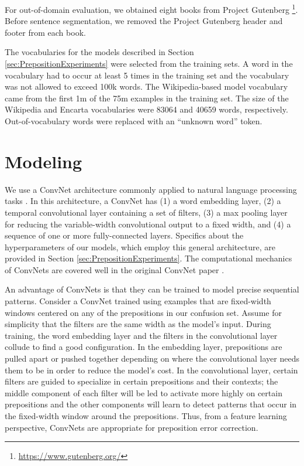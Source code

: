 For out-of-domain evaluation, we obtained eight books from Project Gutenberg \footnote{\url{https://www.gutenberg.org/}}.  Before sentence segmentation, we removed the Project Gutenberg header and footer from each book.

The vocabularies for the models described in Section \ref{sec:PrepositionExperiments} were selected from the training sets.  A word in the vocabulary had to occur at least 5 times in the training set and the vocabulary was not allowed to exceed 100k words.  The Wikipedia-based model vocabulary came from the first 1m of the 75m examples in the training set.  The size of the Wikipedia and Encarta vocabularies were 83064 and 40659 words, respectively.  Out-of-vocabulary words were replaced with an ``unknown word'' token. 

\section{Modeling} 
\label{sec:PrepositionModel}


We use a ConvNet architecture commonly applied to natural language processing tasks \cite{collobert2008unified,kim2014}.  In this architecture, a ConvNet has (1) a word embedding layer, (2) a temporal convolutional layer containing a set of filters, (3) a max pooling layer for reducing the variable-width convolutional output to a fixed width, and (4) a sequence of one or more fully-connected layers.  Specifics about the hyperparameters of our models, which employ this general architecture, are provided in Section \ref{sec:PrepositionExperiments}.  The computational mechanics of ConvNets are covered well in the original ConvNet paper \cite{LeCun98}. 

An advantage of ConvNets is that they can be trained to model precise sequential patterns.  Consider a ConvNet trained using examples that are fixed-width windows centered on any of the prepositions in our confusion set. Assume for simplicity that the filters are the same width as the model's input.  During training, the word embedding layer and the filters in the convolutional layer collude to find a good configuration.  In the embedding layer, prepositions are pulled apart or pushed together depending on where the convolutional layer needs them to be in order to reduce the model's cost.  In the convolutional layer, certain filters are guided to specialize in certain prepositions and their contexts; the middle component of each filter will be led to activate more highly on certain prepositions and the other components will learn to detect patterns that occur in the fixed-width window around the prepositions.  Thus, from a feature learning perspective, ConvNets are appropriate for preposition error correction.

